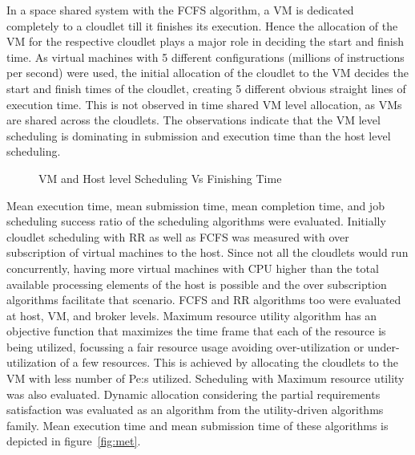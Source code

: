 \documentclass[times, 10pt,twocolumn]{article}
\begin{document}
In a space shared system with the FCFS algorithm, a VM is dedicated completely to a cloudlet till it finishes its execution. Hence the allocation of the VM for the respective cloudlet plays a major role in deciding the start and finish time. As virtual machines with 5 different configurations (millions of instructions per second) were used, the initial allocation of the cloudlet to the VM decides the start and finish times of the cloudlet, creating 5 different obvious straight lines of execution time. This is not observed in time shared VM level allocation, as VMs are shared across the cloudlets. The observations indicate that the VM level scheduling is dominating in submission and execution time than the host level scheduling.
\begin{figure}[ht]
 \caption{VM and Host level Scheduling Vs Finishing Time}
 \label{fig:finish}
\end{figure}

Mean execution time, mean submission time, mean completion time, and job scheduling success ratio of the scheduling algorithms were evaluated. Initially cloudlet scheduling with RR as well as FCFS was measured with over subscription of virtual machines to the host. Since not all the cloudlets would run concurrently, having more virtual machines with CPU higher than the total available processing elements of the host is possible and the over subscription algorithms facilitate that scenario. FCFS and RR algorithms too were evaluated at host, VM, and broker levels. Maximum resource utility algorithm has an objective function that maximizes the time frame that each of the resource is being utilized, focussing a fair resource usage avoiding over-utilization or under-utilization of a few resources. This is achieved by allocating the cloudlets to the VM with less number of Pe:s utilized. Scheduling with Maximum resource utility was also evaluated. Dynamic allocation considering the partial requirements satisfaction was evaluated as an algorithm from the utility-driven algorithms family. Mean execution time and mean submission time of these algorithms is depicted in figure~\ref{fig:met}.
\end{document}
